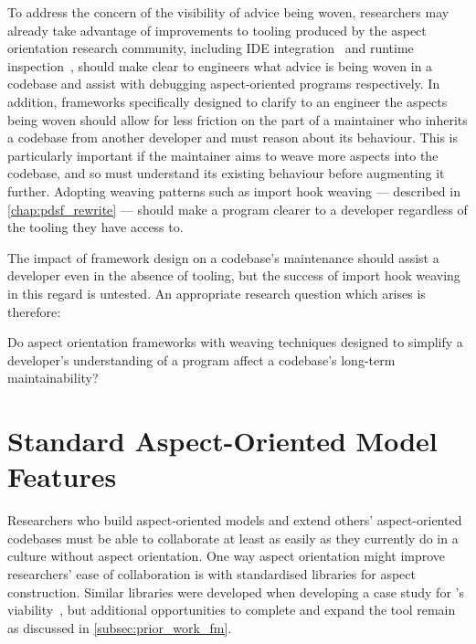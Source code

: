 To address the concern of the visibility of advice being woven, researchers may
already take advantage of improvements to tooling produced by the aspect
orientation research community, including IDE
integration~\cite{clement2003eclipseAJDT} and runtime
inspection~\cite{mehner2002towards}, should make clear to engineers what advice
is being woven in a codebase and assist with debugging aspect-oriented programs
respectively. In addition, \aspectorientation{} frameworks specifically designed
to clarify to an engineer the aspects being woven should allow for less friction
on the part of a maintainer who inherits a codebase from another developer and
must reason about its behaviour. This is particularly important if the
maintainer aims to weave more aspects into the codebase, and so must understand
its existing behaviour before augmenting it further. Adopting weaving patterns
such as import hook weaving --- described in \cref{chap:pdsf_rewrite} --- should
make a program clearer to a developer regardless of the tooling they have access
to.

The impact of framework design on a codebase's maintenance should assist a
developer even in the absence of tooling, but the success of import hook weaving
in this regard is untested. An appropriate research question which arises is
therefore:

\begin{researchquestion}
Do aspect orientation frameworks with weaving techniques designed to simplify a
developer's understanding of a program affect a codebase's long-term
maintainability?
\end{researchquestion}


\section{Standard Aspect-Oriented Model Features}
\label{standard_aosm_model_features}
\label{future_work_revive_fuzzimoss}

Researchers who build aspect-oriented models and extend others' aspect-oriented
codebases must be able to collaborate at least as easily as they currently do in
a culture without aspect orientation. One way aspect orientation might improve
researchers' ease of collaboration is with standardised libraries for aspect
construction. Similar libraries were developed when developing a case study for
\pdsf{}'s viability~\cite{wallis2018caise,fuzzimoss_repo}, but additional
opportunities to complete and expand the tool remain as discussed in
\cref{subsec:prior_work_fm}.


